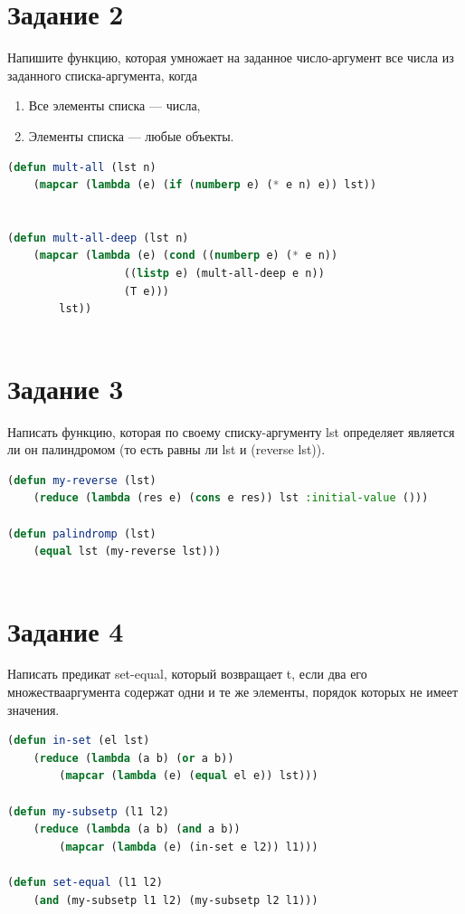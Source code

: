 \documentclass[12pt]{report}
\begin{document}
\section*{Задание 2}
Напишите функцию, которая умножает на заданное число-аргумент все числа из заданного списка-аргумента, когда

\begin{enumerate}
	\item Все элементы списка --- числа,
	\item Элементы списка --- любые объекты.
\end{enumerate}

\begin{lstlisting}[language=Lisp]
(defun mult-all (lst n)
	(mapcar (lambda (e) (if (numberp e) (* e n) e)) lst))
  
	
(defun mult-all-deep (lst n)
	(mapcar (lambda (e) (cond ((numberp e) (* e n))
				  ((listp e) (mult-all-deep e n))
				  (T e)))
		lst))
			  
\end{lstlisting}



\section*{Задание 3}
Написать функцию, которая по своему списку-аргументу lst определяет является ли он палиндромом (то есть равны ли lst и (reverse lst)).
\begin{lstlisting}[language=Lisp]
(defun my-reverse (lst)
	(reduce (lambda (res e) (cons e res)) lst :initial-value ()))
	
(defun palindromp (lst)
	(equal lst (my-reverse lst)))
	
\end{lstlisting}


\section*{Задание 4}
Написать предикат set-equal, который возвращает t, если два его множествааргумента содержат одни и те же элементы, порядок которых не имеет значения.

\begin{lstlisting}[language=Lisp]
(defun in-set (el lst)
	(reduce (lambda (a b) (or a b))
		(mapcar (lambda (e) (equal el e)) lst)))
  
(defun my-subsetp (l1 l2)
	(reduce (lambda (a b) (and a b))
		(mapcar (lambda (e) (in-set e l2)) l1)))
  
(defun set-equal (l1 l2)
	(and (my-subsetp l1 l2) (my-subsetp l2 l1)))  
\end{lstlisting}
\end{document}
